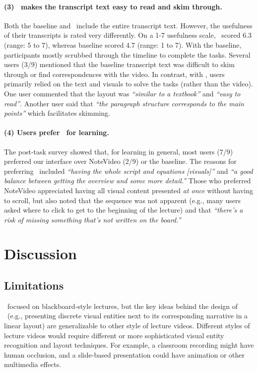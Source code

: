\paragraph{(3) \systemname\ makes the transcript text easy to read and skim through.}
Both the baseline and \systemname\ include the entire transcript text. However,
the usefulness of their transcripts is rated very differently. On a 1-7 usefulness
scale, \systemname\ scored 6.3 (range: 5 to 7), whereas baseline scored 4.7
(range: 1 to 7). With the baseline, participants mostly scrubbed
through the timeline to complete the tasks. Several users (3/9) mentioned
that the baseline transcript text was difficult to skim through or find correspondences
with the video. In contrast, with \systemname, users primarily relied on
the text and visuals to solve the tasks (rather than the video). One user
commented that the layout was \textit{``similar to a textbook''} and \textit{``easy
to read''}. Another user said that \textit{``the paragraph structure corresponds
to the main points''} which facilitates skimming.

\paragraph{(4) Users prefer \systemname\ for learning.}
The post-task survey showed that, for learning in general, most users (7/9) preferred our interface over NoteVideo (2/9) or the baseline. 
The reasons for preferring \systemname\ included \textit{``having the whole script and equations [visuals]''} and \textit{``a good balance between getting the overview and some more detail.''} Those who preferred NoteVideo appreciated having all visual content presented \textit{at once} without having to scroll, but also noted that the sequence was not apparent (e.g., many users asked where to click to get to the beginning of the lecture) and that \textit{``there's a risk of missing something that's not written on the board.''}\\
\section{Discussion}
\label{sec:discussion}
\subsection{Limitations}
\systemname\ focused on blackboard-style lectures, but the key ideas behind the design of \systemname\ (e.g., presenting discrete visual entities next to its corresponding narrative in a linear layout) are generalizable to other style of lecture videos. Different styles of lecture videos would require different or more sophisticated visual entity recognition and layout techniques. For example, a classroom recording might have human occlusion, and a slide-based presentation could have animation or other multimedia effects.\\

